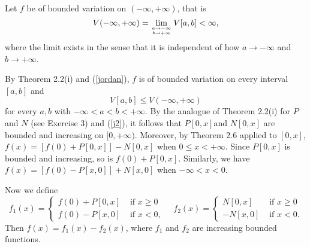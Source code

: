 \begin{exercise}{2.8}
Let $f$ be of bounded variation on $(-\infty,+\infty)$, that is
\begin{equation}\label{jordan}
V(-\infty,+\infty)
=\lim _{a \to -\infty \atop  b \to+\infty}V[a,b]<\infty,
\end{equation}
where the limit exists in the sense that it is independent of how $a\to-\infty$ and $b\to+\infty$.

By Theorem 2.2(i) and  (\ref{jordan}), $f$ is of bounded variation on every interval
$[a,b]$ and
\begin{equation}\label{j2}
V[a,b]\leq V(-\infty,+\infty)
\end{equation}
for every $a,b$ with $-\infty<a<b<+\infty$.
By the analogue of Theorem 2.2(i) for $P$ and $N$ (see Exercise 3) and (\ref{j2}), it follows that $P[0,x]$and $N[0,x]$ are bounded and increasing on $[0,+\infty)$. Moreover, by Theorem 2.6 applied to $[0,x]$, $f(x)=[f(0)+P[0,x]]-N[0,x]$ when $0\leq x<+\infty$. Since $P[0,x]$ is bounded and increasing, so is $f(0)+P[0,x]$. Similarly, we have $f(x)=[f(0)-P[x,0]]+N[x,0]$ when $-\infty<x<0$.

Now we define
\[
  f_1(x)=\left\{\begin{array}{ll}
                  f(0)+P[0,x] & \text { if } x\geq0 \\
                  f(0)-P[x,0] & \text { if } x < 0,
  \end{array} \quad f_2(x)= \begin{cases} N[0,x]& \text { if } x\geq0 \\
  -N[x,0] & \text { if } x < 0 .\end{cases}\right.
\]
Then $f(x)=f_1(x)-f_2(x)$, where $f_1$ and $f_2$ are increasing bounded functions.
\end{exercise}

